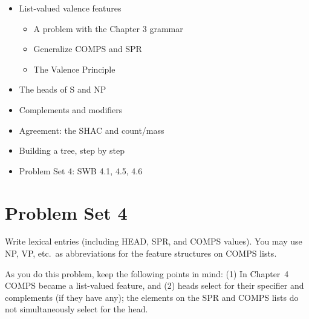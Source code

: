 \documentclass[a4paper,landscape,headrule,footrule]{foils}
\begin{document}
\begin{itemize}
\item List-valued valence features
  \begin{itemize}
  \item A problem with the Chapter 3 grammar
  \item Generalize COMPS and SPR
  \item The Valence Principle
  \end{itemize}
\item The heads of S and NP
\item Complements and modifiers
\item Agreement: the SHAC and count/mass
\item Building a tree, step by step
\item Problem Set 4: SWB 4.1, 4.5, 4.6
\end{itemize}

\section{Problem Set 4}

 Write lexical entries (including
HEAD, SPR, and COMPS values). You may use NP, VP, etc.\ as
abbreviations for the feature structures on COMPS lists.

As you do this problem, keep the following points in mind: (1) In 
Chapter~4 COMPS became a list-valued feature,
and (2) heads select for their specifier and complements (if they have
any); the elements on the SPR and COMPS lists do not
simultaneously select for the head.

\end{document}
